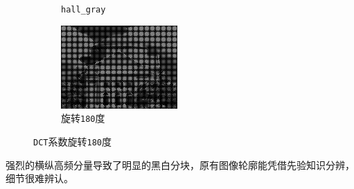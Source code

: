\documentclass{article}
\numberwithin{figure}{section}
\numberwithin{table}{section}
\numberwithin{listing}{section}
\numberwithin{equation}{section}
\begin{document}
\begin{enumerate}
\begin{itemize}
\begin{figure}[H]
\begin{subfigure}{0.5\textwidth}
                                \caption{\texttt{hall\_gray}}
                            \end{subfigure}%
                            \begin{subfigure}{0.5\textwidth}
                                \centering
                                \includegraphics[width=0.6\linewidth]{hall_gray_rot180}
                                \caption{旋转\texttt{180}度}
                            \end{subfigure}
                            \caption{\texttt{DCT}系数旋转\texttt{180}度}
                        \end{figure}

                        强烈的横纵高频分量导致了明显的黑白分块，原有图像轮廓能凭借先验知识分辨，细节很难辨认。

                \end{itemize}

        \end{enumerate}
    
\end{document}
